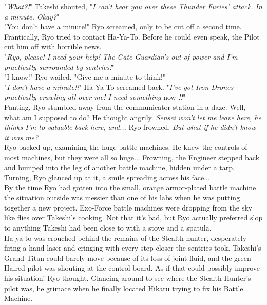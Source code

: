\documentclass[11pt,twoside,a4paper]{book}
\begin{document}
\begin{multicols*}{2}
\vfill
\columnbreak

"\emph{What?!}" Takeshi shouted, "\emph{I can't hear you over these Thunder Furies' attack. In a minute, Okay?}" ~\\

"You don't have a minute!" Ryo screamed, only to be cut off a second time. Frantically, Ryo tried to contact Ha-Ya-To. Before he could even speak, the Pilot cut him off with horrible news. ~\\

"\emph{Ryo, please! I need your help! The Gate Guardian's out of power and I'm practically surrounded by sentries!}" ~\\

"I know!" Ryo wailed. "Give me a minute to think!" ~\\

"\emph{I don't have a minute!!}" Ha-Ya-To screamed back. "\emph{I've got Iron Drones practically crawling all over me! I need something} now \emph{!!}" ~\\

Panting, Ryo stumbled away from the communicator station in a daze. Well, what am I supposed to do? He thought angrily. \emph{Sensei won't let me leave here, he thinks I'm to valuable back here, and...} Ryo frowned. \emph{But what if he didn't know it was me?} ~\\

Ryo backed up, examining the huge battle machines. He knew the controls of most machines, but they were all so huge... Frowning, the Engineer stepped back and bumped into the leg of another battle machine, hidden under a tarp. Turning, Ryo glanced up at it, a smile spreading across his face... ~\\

By the time Ryo had gotten into the small, orange armor-plated battle machine the situation outside was messier than one of his labs when he was putting together a new project. Exo-Force battle machines were dropping from the sky like flies over Takeshi's cooking. Not that it's bad, but Ryo actually preferred slop to anything Takeshi had been close to with a stove and a spatula. ~\\

Ha-ya-to was crouched behind the remains of the Stealth hunter, desperately firing a hand laser and cringing with every step closer the sentries took. Takeshi's Grand Titan could barely move because of its loss of joint fluid, and the green-Haired pilot was shouting at the control board. As if that could possibly improve his situation! Ryo thought. Glancing around to see where the Stealth Hunter's pilot was, he grimace when he finally located Hikaru trying to fix his Battle Machine. ~\\


\end{multicols*}
\end{document}
